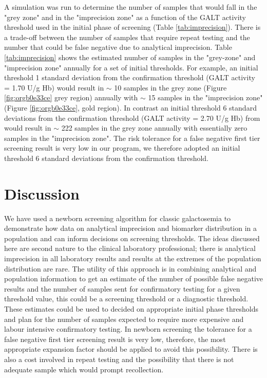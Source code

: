 \documentclass[review]{elsarticle}
\begin{document}
A simulation was run to determine the number of samples that would
fall in the "grey zone" and in the "imprecision zone" as a function of
the GALT activity threshold used in the initial phase of screening
(Table \ref{tab:imprecision}). There is a trade-off between the number
of samples that require repeat testing and the number that could be
false negative due to analytical imprecision. Table
\ref{tab:imprecision} shows the estimated number of samples in the
"grey-zone" and "imprecision zone" annually for a set of initial
thresholds. For example, an initial threshold 1 standard deviation
from the confirmation threshold (GALT activity = 1.70 U/g Hb) would
result in \(\sim\) 10 samples in the grey zone (Figure \ref{fig:orgb0e33ce}
grey region) annually with \(\sim\) 15 samples in the "imprecision zone"
(Figure \ref{fig:orgb0e33ce}, gold region). In contrast an initial
threshold 6 standard deviations from the confirmation threshold (GALT
activity = 2.70 U/g Hb) from would result in \(\sim\) 222 samples in the
grey zone annually with essentially zero samples in the "imprecision
zone". The risk tolerance for a false negative first tier screening
result is very low in our program, we therefore adopted an initial
threshold 6 standard deviations from the confirmation threshold.

\section*{Discussion}
\label{sec:org5ff0e47}

We have used a newborn screening algorithm for classic galactosemia to
demonstrate how data on analytical imprecision and biomarker
distribution in a population and can inform decisions on screening
thresholds. The ideas discussed here are second nature to the clinical
laboratory professional; there is analytical imprecision in all
laboratory results and results at the extremes of the population
distribution are rare. The utility of this approach is in combining
analytical and population information to get an estimate of the number
of possible false negative results and the number of samples sent for
confirmatory testing for a given threshold value, this could be a
screening threshold or a diagnostic threshold. These estimates could
be used to decided on appropriate initial phase thresholds and plan
for the number of samples expected to require more expensive and
labour intensive confirmatory testing. In newborn screening the
tolerance for a false negative first tier screening result is very
low, therefore, the most appropriate expansion factor should be
applied to avoid this possibility. There is also a cost involved in
repeat testing and the possibility that there is not adequate sample
which would prompt recollection.
\end{document}
